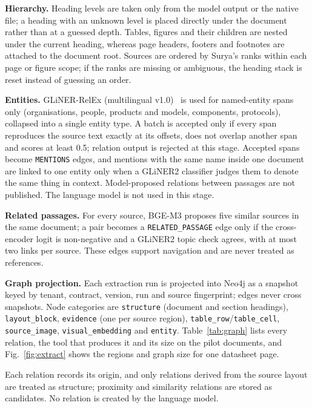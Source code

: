 \documentclass[conference]{IEEEtran}
\begin{document}
\textbf{Hierarchy.} Heading levels are taken only from the model output or the native file; a heading with an unknown level is placed directly under the document rather than at a guessed depth. Tables, figures and their children are nested under the current heading, whereas page headers, footers and footnotes are attached to the document root. Sources are ordered by Surya's ranks within each page or figure scope; if the ranks are missing or ambiguous, the heading stack is reset instead of guessing an order.

\textbf{Entities.} GLiNER-RelEx (multilingual v1.0)~\cite{zaratiana2024gliner} is used for named-entity spans only (organisations, people, products and models, components, protocols), collapsed into a single entity type. A batch is accepted only if every span reproduces the source text exactly at its offsets, does not overlap another span and scores at least 0.5; relation output is rejected at this stage. Accepted spans become \texttt{MENTIONS} edges, and mentions with the same name inside one document are linked to one entity only when a GLiNER2 classifier judges them to denote the same thing in context. Model-proposed relations between passages are not published. The language model is not used in this stage.

\textbf{Related passages.} For every source, BGE-M3 proposes five similar sources in the same document; a pair becomes a \texttt{RELATED\_PASSAGE} edge only if the cross-encoder logit is non-negative and a GLiNER2 topic check agrees, with at most two links per source. These edges support navigation and are never treated as references.

\textbf{Graph projection.} Each extraction run is projected into Neo4j as a snapshot keyed by tenant, contract, version, run and source fingerprint; edges never cross snapshots. Node categories are \texttt{structure} (document and section headings), \texttt{layout\_block}, \texttt{evidence} (one per source region), \texttt{table\_row}/\texttt{table\_cell}, \texttt{source\_image}, \texttt{visual\_embedding} and \texttt{entity}. Table~\ref{tab:graph} lists every relation, the tool that produces it and its size on the pilot documents, and Fig.~\ref{fig:extract} shows the regions and graph size for one datasheet page.


 Each relation records its origin, and only relations derived from the source layout are treated as structure; proximity and similarity relations are stored as candidates. No relation is created by the language model.
\end{document}

